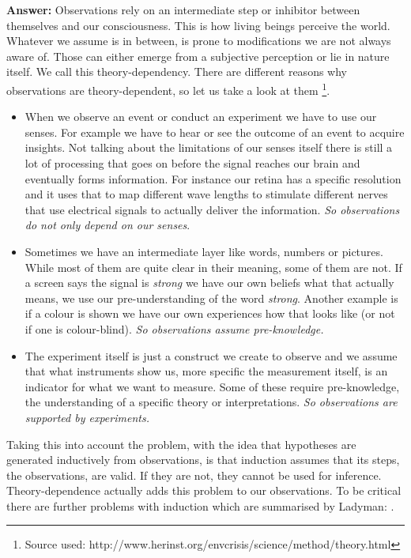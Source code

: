 \documentclass[11pt]{scrartcl}
\begin{document}
\bigbreak

\textbf{Answer:} Observations rely on an intermediate step or inhibitor between themselves and our consciousness. This is how living beings perceive the world. Whatever we assume is in between, is prone to modifications we are not always aware of. Those can either emerge from a subjective perception or lie in nature itself. We call this theory-dependency. There are different reasons why observations are theory-dependent, so let us take a look at them \footnote{Source used: http://www.herinst.org/envcrisis/science/method/theory.html}.

\begin{itemize}
  \item When we observe an event or conduct an experiment we have to use our senses. For example we have to hear or see the outcome of an event to acquire insights. Not talking about the limitations of our senses itself there is still a lot of processing that goes on before the signal reaches our brain and eventually forms information. For instance our retina has a specific resolution and it uses that to map different wave lengths to stimulate different nerves that use electrical signals to actually deliver the information. \textit{So observations do not only depend on our senses}.
  \item Sometimes we have an intermediate layer like words, numbers or pictures. While most of them are quite clear in their meaning, some of them are not. If a screen says the signal is \textit{strong} we have our own beliefs what that actually means, we use our pre-understanding of the word \textit{strong}. Another example is if a colour is shown we have our own experiences how that looks like (or not if one is colour-blind). \textit{So observations assume pre-knowledge.}
  \item The experiment itself is just a construct we create to observe and we assume that what instruments show us, more specific the measurement itself, is an indicator for what we want to measure. Some of these require pre-knowledge, the understanding of a specific theory or interpretations. \textit{So observations are supported by experiments.}
  \end{itemize}
  
 Taking this into account the problem, with the idea that hypotheses are generated inductively from observations, is that induction assumes that its steps, the observations, are valid. If they are not, they cannot be used for inference. Theory-dependence actually adds this problem to our observations. To be critical there are further problems with induction which are summarised by Ladyman:  \cite[p. 40]{ladyman}.
 
\end{document}
